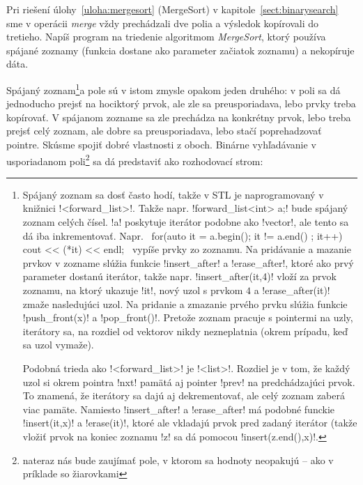 \begin{uloha}
  Pri riešení úlohy~\ref{uloha:mergesort} (MergeSort) v kapitole~\ref{sect:binarysearch}
  sme v operácii {\em merge}
  vždy prechádzali dve polia a výsledok kopírovali do tretieho. Napíš program na 
  triedenie algoritmom {\em MergeSort}, ktorý používa spájané zoznamy (funkcia
   dostane ako parameter začiatok zoznamu) a nekopíruje
  dáta.
\end{uloha}


Spájaný zoznam\footnote{%
  Spájaný zoznam sa dosť často hodí, takže v STL je naprogramovaný v knižnici 
  \prg!<forward_list>!. Takže napr. \prg!forward_list<int> a;! 
  bude spájaný zoznam celých čísel. \prg!a! poskytuje iterátor podobne ako \prg!vector!,
  ale tento sa dá iba inkrementovať. Napr. 
  \prg~for(auto it = a.begin(); it != a.end() ; it++) cout << (*it) << endl;~
  vypíše prvky zo zoznamu. Na pridávanie a mazanie prvkov v zozname slúžia
  funkcie \prg!insert_after! a \prg!erase_after!, ktoré ako prvý parameter dostanú 
  iterátor, takže napr. \prg!insert_after(it,4)! vloží za prvok zoznamu, na ktorý ukazuje
  \prg!it!, nový uzol s prvkom $4$ a \prg!erase_after(it)! zmaže nasledujúci uzol.
  Na pridanie a zmazanie prvého prvku slúžia funkcie \prg!push_front(x)! a 
  \prg!pop_front()!.
  Pretože zoznam pracuje s pointermi na uzly, iterátory sa, na rozdiel od vektorov
  nikdy nezneplatnia (okrem prípadu, keď sa uzol vymaže).

  Podobná trieda ako \prg!<forward_list>! je \prg!<list>!. Rozdiel je v tom, že každý
  uzol si okrem pointra \prg!nxt! pamätá aj pointer \prg!prev! na predchádzajúci prvok.
  To znamená, že iterátory sa dajú aj dekrementovať, ale celý zoznam zaberá viac pamäte.
  Namiesto \prg!insert_after! a \prg!erase_after! má podobné funckie \prg!insert(it,x)! a
  \prg!erase(it)!, ktoré ale vkladajú prvok pred zadaný iterátor (takže vložiť prvok na 
  koniec zoznamu \prg!z! sa dá pomocou \prg!insert(z.end(),x)!.
}a pole sú v istom zmysle opakom jeden druhého: v poli sa dá jednoducho prejsť
na hociktorý prvok, ale zle sa preusporiadava, lebo prvky treba kopírovať. V spájanom zozname
sa zle prechádza na konkrétny prvok, lebo treba prejsť celý zoznam, ale dobre sa
preusporiadava, lebo stačí poprehadzovať pointre. Skúsme spojiť dobré vlastnosti z oboch.
Binárne vyhľadávanie v usporiadanom poli\footnote{%
  nateraz nás bude zaujímať pole, v ktorom sa hodnoty neopakujú -- 
  ako v príklade so žiarovkami} sa dá predstaviť ako rozhodovací strom:


